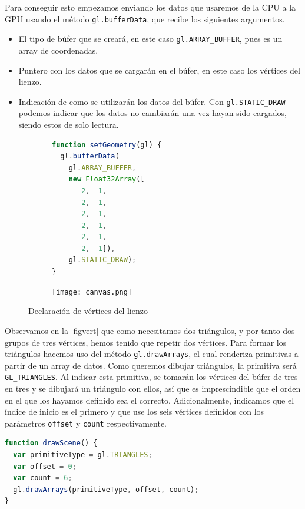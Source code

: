 Para conseguir esto empezamos enviando los datos que usaremos de la CPU a la GPU usando el método \texttt{gl.bufferData}, que recibe los siguientes argumentos.
\begin{itemize}
  \item El tipo de búfer que se creará, en este caso \texttt{gl.ARRAY\_BUFFER}, pues es un array de coordenadas.
  \item Puntero con los datos que se cargarán en el búfer, en este caso los vértices del lienzo.
  \item Indicación de como se utilizarán los datos del búfer. Con \texttt{gl.STATIC\_DRAW} podemos indicar que los datos no cambiarán una vez hayan sido cargados, siendo estos de solo lectura.
\end{itemize}
\begin{figure}[ht!]
    \centering
    \begin{subfigure}[b]{0.50\textwidth}
        \begin{lstlisting}[language=JavaScript]
function setGeometry(gl) {
  gl.bufferData(
    gl.ARRAY_BUFFER,
    new Float32Array([
      -2, -1,
      -2,  1,
       2,  1,
      -2, -1,
       2,  1,
       2, -1]),
    gl.STATIC_DRAW);
}
\end{lstlisting}
    \end{subfigure}%
    \hfill
    \begin{subfigure}[b]{0.40\textwidth}
        \texttt{[image: canvas.png]}
    \end{subfigure}
    \caption{Declaración de vértices del lienzo}
    \label{figvert}
\end{figure}
Observamos en la \autoref{figvert} que como necesitamos dos triángulos, y por tanto dos grupos de tres vértices, hemos tenido que repetir dos vértices. Para formar los triángulos hacemos uso del método \texttt{gl.drawArrays}, el cual renderiza primitivas a partir de un array de datos. Como queremos dibujar triángulos, la primitiva será \texttt{GL\_TRIANGLES}. Al indicar esta primitiva, se tomarán los vértices del búfer de tres en tres y se dibujará un triángulo con ellos, así que es imprescindible que el orden en el que los hayamos definido sea el correcto. Adicionalmente, indicamos que el índice de inicio es el primero y que use los seis vértices definidos con los parámetros \texttt{offset} y \texttt{count} respectivamente.
\begin{lstlisting}[language=JavaScript]
function drawScene() {
  var primitiveType = gl.TRIANGLES;
  var offset = 0;
  var count = 6;
  gl.drawArrays(primitiveType, offset, count);
}
\end{lstlisting}
